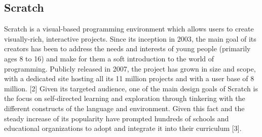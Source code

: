 \subsection{Scratch}
Scratch is a visual-based programming environment which allows users to create visually-rich, interactive projects.  Since its inception in 2003, the main goal of its creators has been to address the needs and interests of young people (primarily ages 8 to 16) and make for them a soft introduction to the world of programming. Publicly released in 2007, the project has grown in size and scope, with a dedicated site hosting all its 11 million projects and with a user base of 8 million. [2]
Given its targeted audience, one of the main design goals of Scratch is the focus on self-directed learning and exploration through tinkering with the different constructs of the language and environment. Given this fact and the steady increase of its popularity have prompted hundreds of schools and educational organizations to adopt and integrate it into their curriculum [3].




